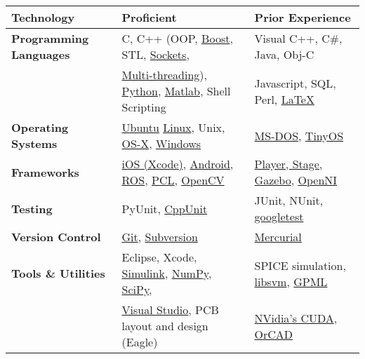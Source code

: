 \begin{table*}[h]
    \begin{tabular}{|lll|}
        \hline \bfseries Technology & \bfseries Proficient & \bfseries Prior Experience \\\hline 
        \hline \bfseries Programming Languages & C, C++ (OOP, \href{http://boost.org}{Boost}, STL, \href{http://beej.us/guide/bgnet/output/html/multipage/index.html}{Sockets},  & Visual C++, C\#, Java, Obj-C  \\
        & \href{https://computing.llnl.gov/tutorials/pthreads/}{Multi-threading}), \href{http://www.greenteapress.com/thinkpython/html/index.html}{Python}, \href{http://www.mathworks.com/}{Matlab}, Shell Scripting &  Javascript, SQL, Perl, \href{http://www.latex-project.org/}{\LaTeX} \\
        \hline \bfseries Operating Systems & \href{http://www.ubuntu.com/}{Ubuntu} \href{http://www.linux.org/}{Linux}, Unix, \href{https://developer.apple.com/}{OS-X}, \href{http://windows.microsoft.com/en-us/windows/home}{Windows} & \href{http://en.wikipedia.org/wiki/DOS}{MS-DOS}, \href{http://www.tinyos.net/}{TinyOS}  \\
        \hline \bfseries Frameworks & \href{https://developer.apple.com/devcenter/ios/index.action}{iOS (Xcode)}, \href{http://developer.android.com/index.html}{Android}, \href{http://www.ros.org/wiki/}{ROS}, \href{http://pointclouds.org/}{PCL}, \href{http://opencv.org/}{OpenCV} &  \href{http://playerstage.sourceforge.net/} {Player, Stage,} \href{http://gazebosim.org/}{Gazebo}, \href{http://www.openni.org/}{OpenNI}  \\
        \hline \bfseries Testing & PyUnit, \href{http://robotics.usc.edu/~ampereir/wordpress/?p=772}{CppUnit} & JUnit, NUnit, \href{https://code.google.com/p/googletest/}{googletest} \\
        \hline \bfseries Version Control & \href{http://robotics.usc.edu/~ampereir/wordpress/?p=487}{Git}, \href{http://subversion.apache.org/}{Subversion} &  \href{http://mercurial.selenic.com/}{Mercurial} \\
        \hline \bfseries Tools \& Utilities & Eclipse, Xcode, \href{http://www.mathworks.com/products/simulink/}{Simulink}, \href{http://www.numpy.org/}{NumPy}, \href{http://www.scipy.org/}{SciPy},  & SPICE simulation, \href{http://www.csie.ntu.edu.tw/~cjlin/libsvm/}{libsvm}, \href{http://www.gaussianprocess.org/gpml/code/matlab/doc/}{GPML} \\
           &  \href{http://www.microsoft.com/visualstudio/}{Visual Studio}, PCB layout and design (Eagle) & \href{https://developer.nvidia.com/category/zone/cuda-zone}{NVidia's CUDA}, \href{http://www.cadence.com/products/orcad/pages/default.aspx}{OrCAD} \\

\end{tabular}
\end{table*}
